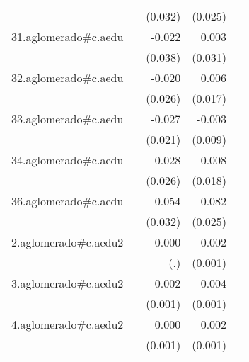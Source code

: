 {\begin{longtable}{l*{4}{D{.}{.}{-1}}}
            &                     &     (0.032)         &     (0.025)         &                     \\
\addlinespace
31.aglomerado#c.aedu&                     &      -0.022         &       0.003         &                     \\
            &                     &     (0.038)         &     (0.031)         &                     \\
\addlinespace
32.aglomerado#c.aedu&                     &      -0.020         &       0.006         &                     \\
            &                     &     (0.026)         &     (0.017)         &                     \\
\addlinespace
33.aglomerado#c.aedu&                     &      -0.027         &      -0.003         &                     \\
            &                     &     (0.021)         &     (0.009)         &                     \\
\addlinespace
34.aglomerado#c.aedu&                     &      -0.028         &      -0.008         &                     \\
            &                     &     (0.026)         &     (0.018)         &                     \\
\addlinespace
36.aglomerado#c.aedu&                     &       0.054         &       0.082\sym{**} &                     \\
            &                     &     (0.032)         &     (0.025)         &                     \\
\addlinespace
2.aglomerado#c.aedu2&                     &       0.000         &       0.002\sym{*}  &                     \\
            &                     &         (.)         &     (0.001)         &                     \\
\addlinespace
3.aglomerado#c.aedu2&                     &       0.002         &       0.004\sym{***}&                     \\
            &                     &     (0.001)         &     (0.001)         &                     \\
\addlinespace
4.aglomerado#c.aedu2&                     &       0.000         &       0.002\sym{***}&                     \\
            &                     &     (0.001)         &     (0.001)         &                     \\

\end{longtable}}
